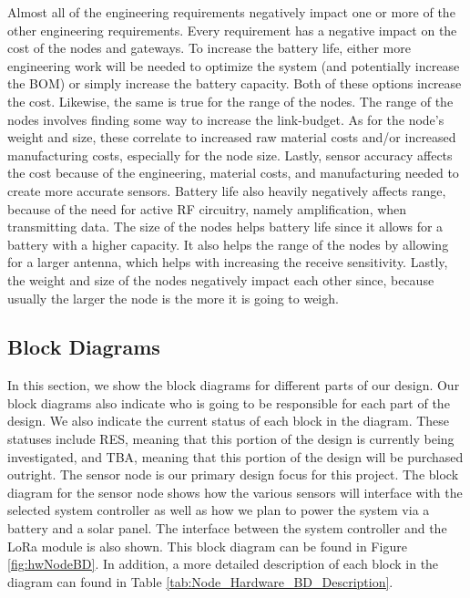 Almost all of the engineering requirements negatively impact one or more of the
other engineering requirements. Every requirement has a negative impact on the
cost of the nodes and gateways. To increase the battery life, either more
engineering work will be needed to optimize the system (and potentially increase
the BOM) or simply increase the battery capacity. Both of these options increase
the cost.  Likewise, the same is true for the range of the nodes. The range of
the nodes involves finding some way to increase the link-budget. As for the
node's weight and size, these correlate to increased raw material costs and/or
increased manufacturing costs, especially for the node size. Lastly, sensor
accuracy affects the cost because of the engineering, material costs, and
manufacturing needed to create more accurate sensors. Battery life also heavily
negatively affects range, because of the need for active RF circuitry,
namely amplification, when transmitting data. The size of the nodes helps battery
life since it allows for a battery with a higher capacity. It also helps the
range of the nodes by allowing for a larger antenna, which helps with increasing
the receive sensitivity. Lastly, the weight and size of the nodes negatively
impact each other since, because usually the larger the node is the more it is
going to weigh.

\subsection{Block Diagrams}
In this section, we show the block diagrams for different parts of our design. Our block diagrams also indicate who is going to be responsible for each part of the design. We also indicate the current status of each block in the diagram. These statuses include RES, meaning that this portion of the design is currently being investigated, and TBA, meaning that this portion of the design will be purchased outright. The sensor node is our primary design focus for this project. The block diagram for the sensor node shows how the various sensors will interface with the selected system controller as well as how we plan to power the system via a battery and a solar panel. The interface between the system controller and the LoRa module is also shown. This block diagram can be found in Figure \ref{fig:hwNodeBD}. In addition, a more detailed description of each block in the diagram can found in Table \ref{tab:Node_Hardware_BD_Description}.

